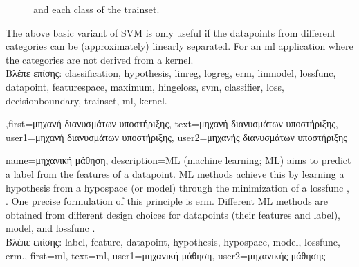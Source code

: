 {{\begin{figure}[H]
\begin{center}
{					and each class of the \gls{trainset}.}
				\label{fig_svm_gls_dict}
			\end{center}
		\end{figure}
		The above basic variant of SVM is only useful if the \gls{datapoint}s from different categories can be  
		(approximately) linearly separated. For an \gls{ml} application where the categories are not 
		derived from a \gls{kernel}.\\
		\foreignlanguage{greek}{Βλέπε επίσης:} \gls{classification}, \gls{hypothesis}, \gls{linreg}, \gls{logreg}, \gls{erm}, \gls{linmodel}, \gls{lossfunc}, \gls{datapoint}, \gls{featurespace}, \gls{maximum}, \gls{hingeloss}, \gls{svm}, \gls{classifier}, \gls{loss}, \gls{decisionboundary}, \gls{trainset}, \gls{ml}, \gls{kernel}.
},first={\foreignlanguage{greek}{μηχανή διανυσμάτων υποστήριξης}},
text={\foreignlanguage{greek}{μηχανή διανυσμάτων υποστήριξης}},
user1={\foreignlanguage{greek}{μηχανή διανυσμάτων υποστήριξης}}, %
user2={\foreignlanguage{greek}{μηχανής διανυσμάτων υποστήριξης}} %
}

{name={\foreignlanguage{greek}{μηχανική μάθηση}},
		 description={ML (machine learning; ML) aims to predict 
	 a \gls{label} from the \gls{feature}s of a \gls{datapoint}. ML methods achieve 
	 this by learning a \gls{hypothesis} from a \gls{hypospace} (or \gls{model}) 
	 through the minimization of a \gls{lossfunc} \cite{MLBasics}, \cite{HastieWainwrightBook}. 
	 One precise formulation of this principle is \gls{erm}. Different ML methods are 
	 obtained from different design choices for \gls{datapoint}s (their \gls{feature}s and \gls{label}), 
	 \gls{model}, and \gls{lossfunc} \cite[Ch. 3]{MLBasics}.\\
	 \foreignlanguage{greek}{Βλέπε επίσης:} \gls{label}, \gls{feature}, \gls{datapoint}, \gls{hypothesis}, \gls{hypospace}, \gls{model}, \gls{lossfunc}, \gls{erm}.},
	first={ml},
	text={ml},
	user1={\foreignlanguage{greek}{μηχανική μάθηση}}, %
	user2={\foreignlanguage{greek}{μηχανικής μάθησης}} %
} 

